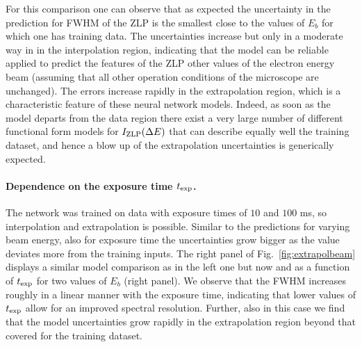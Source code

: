 For this comparison one can observe that as expected the uncertainty in the  prediction for FWHM
of the ZLP is the smallest close to the values of $E_b$ for which one has training data.
%
The uncertainties increase but only in a moderate way in in the interpolation region, indicating that
the model can be reliable applied to predict the features of the ZLP other values of the electron
energy beam (assuming that all other operation conditions of the microscope are unchanged).
%
The errors increase rapidly in the extrapolation region, which is a characteristic feature of
these neural network models.
%
Indeed, as soon as the model departs from the data region there exist a very large
number of different functional form models for $I_{\rm ZLP}(\Delta E)$ that can describe equally well
the training dataset, and hence a blow up of the extrapolation uncertainties is generically expected.

\paragraph{Dependence on the exposure time $t_{\rm exp}$.}
%
The network was trained on data with exposure times of $10$ and $100$ ms,
so interpolation and extrapolation is possible. Similar to the predictions for varying beam energy, also for exposure time the uncertainties grow bigger as the value deviates more from the training inputs.
%
The right panel of Fig.~\ref{fig:extrapolbeam} displays a similar model
comparison as in the left one but now and as a function of $t_{\rm exp}$ for two values of $E_b$ (right panel).
%
We observe that the FWHM increases roughly in a linear manner with the exposure time, indicating
that lower values of $t_{\rm exp}$ allow for an improved spectral resolution.
%
Further, also in this case we find that the model uncertainties grow rapidly in the
extrapolation region beyond that covered for the training dataset.


